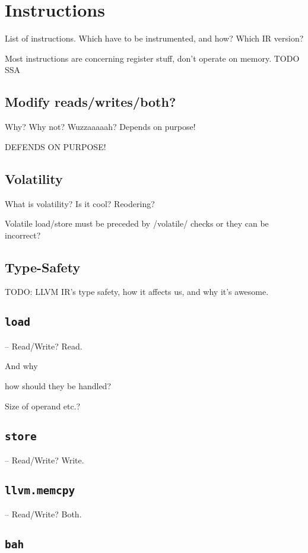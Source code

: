 \section {Instructions}

List of instructions. Which have to be instrumented, and how? Which IR version?

Most instructions are concerning register stuff, don't operate on memory. TODO
SSA

\subsection {Modify reads/writes/both?}

Why? Why not? Wuzzaaaaah?
Depends on purpose!

DEFENDS ON PURPOSE!

\subsection {Volatility}

What is volatility? Is it cool? Reodering?

Volatile load/store must be preceded by /volatile/ checks or they can be
incorrect?

\subsection {Type-Safety}

TODO: LLVM IR's type safety, how it affects us, and why it's awesome.

\subsection {\texttt{load}}

-- Read/Write? Read.

And why

how should they be handled?

Size of operand etc.?

\subsection {\texttt{store}}

-- Read/Write? Write.

\subsection {\texttt{llvm.memcpy}}

-- Read/Write? Both.

\subsection {\texttt{bah}}

